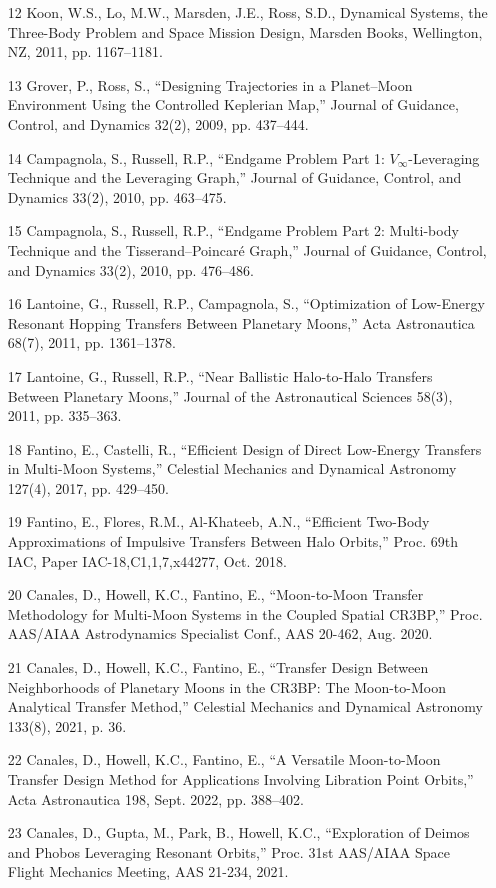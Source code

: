 \documentclass[12pt]{article}
\begin{document}
\begin{enumerate}
\item [12] Koon, W.S., Lo, M.W., Marsden, J.E., Ross, S.D., Dynamical Systems, the Three-Body Problem and Space Mission Design, Marsden Books, Wellington, NZ, 2011, pp. 1167--1181.
\item [13] Grover, P., Ross, S., ``Designing Trajectories in a Planet--Moon Environment Using the Controlled Keplerian Map,'' Journal of Guidance, Control, and Dynamics 32(2), 2009, pp. 437--444.
\item [14] Campagnola, S., Russell, R.P., ``Endgame Problem Part 1: $V_\infty$-Leveraging Technique and the Leveraging Graph,'' Journal of Guidance, Control, and Dynamics 33(2), 2010, pp. 463--475.
\item [15] Campagnola, S., Russell, R.P., ``Endgame Problem Part 2: Multi-body Technique and the Tisserand--Poincaré Graph,'' Journal of Guidance, Control, and Dynamics 33(2), 2010, pp. 476--486.
\item [16] Lantoine, G., Russell, R.P., Campagnola, S., ``Optimization of Low-Energy Resonant Hopping Transfers Between Planetary Moons,'' Acta Astronautica 68(7), 2011, pp. 1361--1378.
\item [17] Lantoine, G., Russell, R.P., ``Near Ballistic Halo-to-Halo Transfers Between Planetary Moons,'' Journal of the Astronautical Sciences 58(3), 2011, pp. 335--363.
\item [18] Fantino, E., Castelli, R., ``Efficient Design of Direct Low-Energy Transfers in Multi-Moon Systems,'' Celestial Mechanics and Dynamical Astronomy 127(4), 2017, pp. 429--450.
\item [19] Fantino, E., Flores, R.M., Al-Khateeb, A.N., ``Efficient Two-Body Approximations of Impulsive Transfers Between Halo Orbits,'' Proc. 69th IAC, Paper IAC-18,C1,1,7,x44277, Oct. 2018.
\item [20] Canales, D., Howell, K.C., Fantino, E., ``Moon-to-Moon Transfer Methodology for Multi-Moon Systems in the Coupled Spatial CR3BP,'' Proc. AAS/AIAA Astrodynamics Specialist Conf., AAS 20-462, Aug. 2020.
\item [21] Canales, D., Howell, K.C., Fantino, E., ``Transfer Design Between Neighborhoods of Planetary Moons in the CR3BP: The Moon-to-Moon Analytical Transfer Method,'' Celestial Mechanics and Dynamical Astronomy 133(8), 2021, p. 36.
\item [22] Canales, D., Howell, K.C., Fantino, E., ``A Versatile Moon-to-Moon Transfer Design Method for Applications Involving Libration Point Orbits,'' Acta Astronautica 198, Sept. 2022, pp. 388--402.
\item [23] Canales, D., Gupta, M., Park, B., Howell, K.C., ``Exploration of Deimos and Phobos Leveraging Resonant Orbits,'' Proc. 31st AAS/AIAA Space Flight Mechanics Meeting, AAS 21-234, 2021.

\end{enumerate}
\end{document}
